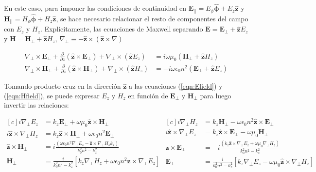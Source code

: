 En este caso, para imponer las condiciones de continuidad en $\textbf{E}_{||} = E_\phi \boldsymbol{\hat{\phi}} + E_z \hat{\textbf{z}}$ y $\textbf{H}_{||}= H_\phi \hat{\boldsymbol{\phi}} + H_z \hat{\textbf{z}}$, se hace necesario relacionar el resto de componentes del campo con $E_z$ y $H_z$. Explícitamente, las ecuaciones de Maxwell separando $\textbf{E}=\textbf{E}_\perp +\hat{\textbf{z}} E_z$ y $\textbf{H}=\textbf{H}_\perp +\hat{\textbf{z}} H_z$, $\nabla_\perp \equiv - \hat{\textbf{z}}\times (\hat{\textbf{z}}\times\nabla)   $

\begin{align}
	\nabla_\perp \times  \textbf{E}_\perp + \frac{\partial}{\partial z} (\hat{\textbf{z}} \times \textbf{E}_\perp) + \nabla_\perp \times (\hat{\textbf{z}} E_z) &= i\omega\mu_0(\textbf{H}_\perp +\hat{\textbf{z}} H_z)
	\label{eqn:Efield}
	\\
	\nabla_\perp \times  \textbf{H}_\perp + \frac{\partial}{\partial z} (\hat{\textbf{z}} \times \textbf{H}_\perp) + \nabla_\perp \times (\hat{\textbf{z}} H_z) &= -i\omega \epsilon_0 n^2 (\textbf{E}_\perp +\hat{\textbf{z}} E_z)
	\label{eqn:Hfield}
\end{align}

Tomando producto cruz en la dirección $\hat{\textbf{z}}$ a las ecuaciones (\ref{eqn:Efield}) y (\ref{eqn:Hfield}), se puede expresar $E_z$ y $H_z$ en función de $\textbf{E}_\perp$ y $\textbf{H}_\perp$ para luego invertir las relaciones: 

\begin{equation*}
\begin{aligned}[c]
	 i\nabla_\perp E_z &= k_z\textbf{E}_\perp +\omega \mu_0 \hat{\textbf{z}} \times \textbf{H}_\perp  
	 	  	 \\
	 	  	i\hat{\textbf{z}} \times \nabla_\perp H_z &= k_z \hat{\textbf{z}} \times\textbf{H}_\perp + \omega\epsilon_0 n^2 \textbf{E}_\perp
	 \\
	  \hat{\textbf{z}} \times \textbf{H}_\perp &= i\frac{(\omega\epsilon_0 n^2 \nabla_\perp E_z  - \hat{\textbf{z}} \times \nabla_\perp H_z k_z)}{k_0^2 n^2 - k_z^2}
	  \\
	  	 \textbf{H}_\perp &= \frac{i}{k_0^2 n^2 - k_z^2}[k_z\nabla_\perp H_z + \omega \epsilon_0 n^2\hat{\textbf{z}} \times \nabla_\perp E_z]
\end{aligned}
\begin{aligned}[c]
	i \nabla_\perp H_z &= k_z \textbf{H}_\perp - \omega \epsilon_0 n^2  \hat{\textbf{z}} \times \textbf{E}_\perp 
	\\
	i\hat{\textbf{z}} \times\nabla_\perp E_z &= k_z  \hat{\textbf{z}} \times \textbf{E}_\perp - \omega \mu_0 \textbf{H}_\perp
	\\
	\hat{\textbf{z}} \times \textbf{E}_\perp &= -i\frac{(k_z\hat{\textbf{z}} \times \nabla_\perp E_z + \omega\mu_0 \nabla_\perp H_z)  }{k_0^2 n^2 - k_z^2}
	\\
	\textbf{E}_\perp &= \frac{i}{k_0^2 n^2 - k_z^2}[k_z \nabla_\perp E_z - \omega\mu_0 \hat{\textbf{z}} \times \nabla_\perp H_z]
\end{aligned}
\end{equation*}

